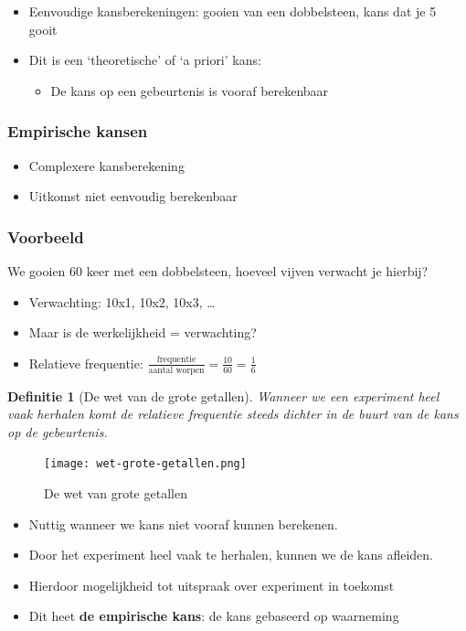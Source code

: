 \documentclass{article}
\newtheorem{theorem}{Definitie}[section]
\begin{document}
\begin{itemize}
    \item Eenvoudige kansberekeningen: gooien van een dobbelsteen, kans dat je 5 gooit
    \item Dit is een `theoretische' of `a priori' kans:
    \begin{itemize}
        \item De kans op een gebeurtenis is vooraf berekenbaar
    \end{itemize}
\end{itemize}

\subsubsection{Empirische kansen}

\begin{itemize}
    \item Complexere kansberekening
    \item Uitkomst niet eenvoudig berekenbaar
\end{itemize}


\subsubsection{Voorbeeld}
We gooien 60 keer met een dobbelsteen, hoeveel vijven verwacht je hierbij?

\begin{itemize}
    \item Verwachting: 10x1, 10x2, 10x3, \dots
    \item Maar is de werkelijkheid = verwachting?
    \item Relatieve frequentie: $\frac{\text{frequentie}}{\text{aantal worpen}} = \frac{10}{60} = \frac16$
\end{itemize}

\begin{theorem}[De wet van de grote getallen]
    Wanneer we een experiment heel vaak herhalen komt de relatieve frequentie steeds dichter in de buurt van de kans op de gebeurtenis.
\end{theorem}

\begin{figure}[H]
    \centering
    \texttt{[image: wet-grote-getallen.png]}
    \caption{De wet van grote getallen}
\end{figure}

\begin{itemize}
    \item Nuttig wanneer we kans niet vooraf kunnen berekenen.
    \item Door het experiment heel vaak te herhalen, kunnen we de kans afleiden.
    \item Hierdoor mogelijkheid tot uitspraak over experiment in toekomst
    \item Dit heet \textbf{de empirische kans}: de kans gebaseerd op waarneming
\end{itemize}
\end{document}
